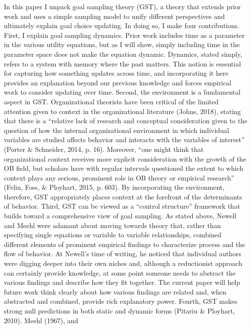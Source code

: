 \documentclass[english,man]{apa6}
\newcounter{author}
\theoremstyle{definition}
\theoremstyle{definition}
\theoremstyle{definition}
\theoremstyle{remark}
\begin{document}
In this paper I unpack goal sampling theory (GST), a theory that extends
prior work and uses a simple sampling model to unify different
perspectives and ultimately explain goal choice updating. In doing so, I
make four contributions. First, I explain goal sampling dynamics. Prior
work includes time as a parameter in the various utility equations, but
as I will show, simply including time in the parameter space does not
make the equation dynamic. Dynamics, stated simply, refers to a system
with memory where the past matters. This notion is essential for
capturing how something updates across time, and incorporating it here
provides an explanation beyond our previous knowledge and forces
empirical work to consider updating over time. Second, the environment
is a fundamental aspect in GST. Organizational theorists have been
critical of the limited attention given to context in the organizational
literature (Johns, 2018), stating that there is a \enquote{relative lack
of research and conceptual consideration given to the question of how
the internal organizational environment in which individual variables
are studied affects behavior and interacts with the variables of
interest} (Porter \& Schneider, 2014, p. 16). Moreover, \enquote{one
might think that organizational context receives more explicit
consideration with the growth of the OB field, but scholars have with
regular intervals questioned the extent to which context plays any
serious, prominent role in OB theory or empirical research} (Felin,
Foss, \& Ployhart, 2015, p. 603). By incorporating the environment,
therefore, GST appropriately places context at the forefront of the
determinants of behavior. Third, GST can be viewed as a \enquote{control
structure} framework that builds toward a comprehensive view of goal
sampling. As stated above, Newell and Meehl were adamant about moving
towards theory that, rather than specifying single equations or variable
to variable relationships, combined different elements of prominent
empirical findings to characterize process and the flow of behavior. At
Newell's time of writing, he noticed that individual authors were
digging deeper into their own niches and, although a reductionist
approach can certainly provide knowledge, at some point someone needs to
abstract the various findings and describe how they fit together. The
current paper will help future work think clearly about how various
findings are related and, when abstracted and combined, provide rich
explanatory power. Fourth, GST makes strong null predictions in both
static and dynamic forms (Pitariu \& Ployhart, 2010). Meehl (1967), and
\end{document}
